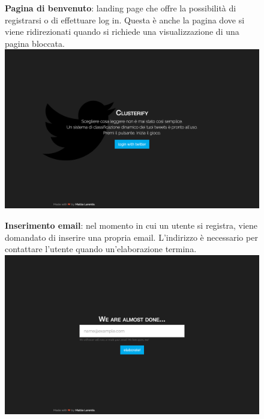         	\begin{figure}[p]
		\textbf{Pagina di benvenuto}: landing page che offre la possibilità di registrarsi o di effettuare log in. Questa è anche la pagina dove si viene ridirezionati quando si richiede una visualizzazione di una pagina bloccata.\\

        		\includegraphics[width=\textwidth]{img/clusterify/welcome.png}
        	\end{figure}
        
        	\begin{figure}[p]
		\textbf{Inserimento email}: nel momento in cui un utente si registra, viene domandato di inserire una propria email. L'indirizzo è necessario per contattare l'utente quando un'elaborazione termina.\\

        		\includegraphics[width=\textwidth]{img/clusterify/email.png}
        	\end{figure}
        
